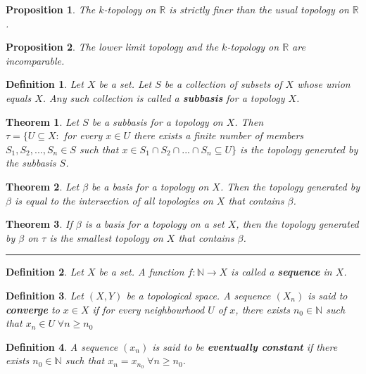 \documentclass[14pt,twoside]{extreport}
\newcommand{\hhrule}{\vspace{1cm}\hrule\vspace{1cm}}
\newtheorem*{defn}{Definition}
\newtheorem*{thm}{Theorem}
\newtheorem*{prop}{Proposition}
\begin{document}
\begin{prop}
    The $k$-topology on $\mathbb{R}$ is strictly finer than the usual topology on $\mathbb{R}$.
\end{prop}

\begin{prop}
    The lower limit topology and the $k$-topology on $\mathbb{R}$ are incomparable.
\end{prop}


\begin{defn}
    Let $X$ be a set. Let $S$ be a collection of subsets of $X$ whose union equals $X$. Any such collection is called a \textbf{subbasis} for a topology $X$.
\end{defn}

\begin{thm}
    Let $S$ be a subbasis for a topology on $X$. Then
    \\ $\tau = \{ U \subseteq X  :  $ for every $ x \in U $ there exists a finite number of members $ S_1, S_2, ..., S_n \in S $ such that $ x \in S_1 \cap S_2 \cap ... \cap S_n \subseteq U \}$ is the topology generated by the subbasis $S$.
\end{thm}

\begin{thm}
    Let $\beta$ be a basis for a topology on $X$. Then the topology generated by $\beta$ is equal to the intersection of all topologies on $X$ that contains $\beta$.
\end{thm}

\begin{thm}
    If $\beta$ is a basis for a topology on a set $X$, then the topology generated by $\beta$ on $\tau$ is the smallest topology on $X$ that contains $\beta$.
\end{thm}

\hhrule

\begin{defn}
    Let $X$ be a set. A function $f \colon \mathbb{N} \to X$ is called a \textbf{sequence} in $X$.
\end{defn}

\begin{defn}
    Let $\left (X, Y\right )$ be a topological space. A sequence $\left (X_n\right )$ is said to \textbf{converge} to $x \in X$ if for every neighbourhood $U$ of $x$, there exists $n_0 \in \mathbb{N}$ such that $x_n \in U \;\forall n \geq n_0$
\end{defn}

\begin{defn}
    A sequence $\left (x_n\right )$ is said to be \textbf{eventually constant} if there exists $n_0 \in \mathbb{N}$ such that $x_n = x_{n_0} \;\forall n \geq n_0$.
\end{defn}
\end{document}
